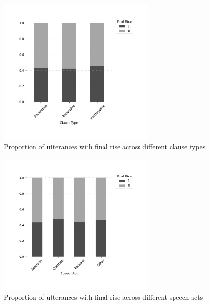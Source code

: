 \begin{figure}[H]
    \centering
    \includegraphics[width=0.7\textwidth]{figures/rise-cl.jpg}
    \caption{Proportion of utterances with final rise across different clause types}
    \label{fig:}
\end{figure}



\begin{figure}[H]
    \centering
    \includegraphics[width=0.7\textwidth]{figures/rise-sp.jpg}
    \caption{Proportion of utterances with final rise across different speech acts}
    \label{fig:}
\end{figure}


